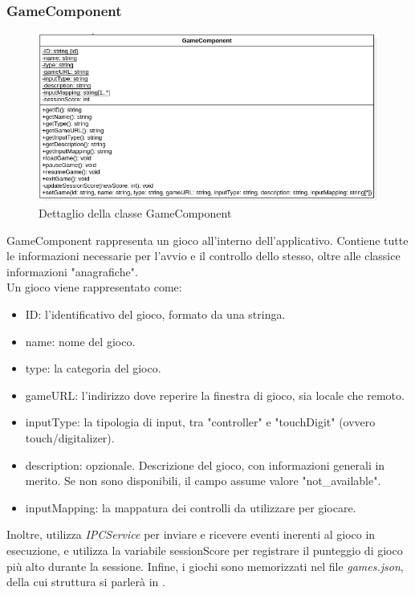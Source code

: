 \subsubsection{GameComponent}
\label{subsec:gameComponent}
\begin{figure}[h]
    \centering
    \includegraphics[width=340pt]{images/prog/Game.png}
    \caption{Dettaglio della classe GameComponent}
    \label{fig:gameComponent}
\end{figure}
GameComponent rappresenta un gioco all'interno dell'applicativo. Contiene tutte le informazioni necessarie per l'avvio e il controllo dello stesso, oltre alle classice informazioni "anagrafiche".\\
Un gioco viene rappresentato come:
\begin{itemize}
    \item ID: l'identificativo del gioco, formato da una stringa.
    \item name: nome del gioco.
    \item type: la categoria del gioco.
    \item gameURL: l'indirizzo dove reperire la finestra di gioco, sia locale che remoto.
    \item inputType: la tipologia di input, tra "controller" e "touchDigit" (ovvero touch/digitalizer).
    \item description: opzionale. Descrizione del gioco, con informazioni generali in merito. Se non sono disponibili, il campo assume valore "not_available".
    \item inputMapping: la mappatura dei controlli da utilizzare per giocare.
\end{itemize}
Inoltre, utilizza \emph{IPCService} per inviare e ricevere eventi inerenti al gioco in esecuzione, e utilizza la variabile sessionScore per registrare il punteggio di gioco più alto durante la sessione.
Infine, i giochi sono memorizzati nel file \emph{games.json}, della cui struttura si parlerà in . 
